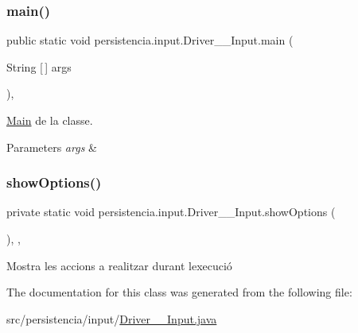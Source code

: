 \subsubsection{\texorpdfstring{main()}{main()}}
{\footnotesize\ttfamily public static void persistencia.\+input.\+Driver\+\_\+\+\_\+\+Input.\+main (\begin{DoxyParamCaption}\item[{String \mbox{[}$\,$\mbox{]}}]{args }\end{DoxyParamCaption})\hspace{0.3cm}{\ttfamily [inline]}, {\ttfamily [static]}}



\hyperlink{classMain}{Main} de la classe. 


\begin{DoxyParams}{Parameters}
{\em args} & \\
\hline
\end{DoxyParams}
\mbox{\label{classpersistencia_1_1input_1_1Driver____Input_a4f8a0f13847071d675771817ee212f2c}} 
\subsubsection{\texorpdfstring{show\+Options()}{showOptions()}}
{\footnotesize\ttfamily private static void persistencia.\+input.\+Driver\+\_\+\+\_\+\+Input.\+show\+Options (\begin{DoxyParamCaption}{ }\end{DoxyParamCaption})\hspace{0.3cm}{\ttfamily [inline]}, {\ttfamily [static]}, {\ttfamily [private]}}



Mostra les accions a realitzar durant l\textquotesingle{}execució 



The documentation for this class was generated from the following file\+:\begin{DoxyCompactItemize}
\item 
src/persistencia/input/\hyperlink{Driver____Input_8java}{Driver\+\_\+\+\_\+\+Input.\+java}\end{DoxyCompactItemize}
